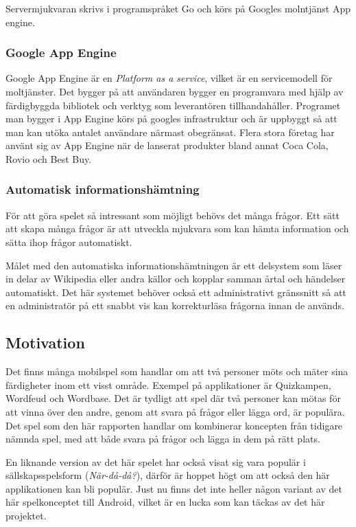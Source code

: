 \documentclass[12pt,a4paper]{article}
\begin{document}
Servermjukvaran skrivs i programspråket Go och körs på Googles molntjänst App engine.

\subsubsection{Google App Engine} 
Google App Engine är en \textit{Platform as a service}, vilket är en servicemodell för moltjänster. Det bygger på att användaren bygger en programvara med hjälp av färdigbyggda bibliotek och verktyg som leverantören tillhandahåller. Programet man bygger i App Engine körs på googles infrastruktur och är uppbyggt så att man kan utöka antalet användare närmast obegränsat. Flera stora företag har använt sig av App Engine när de lanserat produkter bland annat Coca Cola, Rovio och Best Buy. \cite{googleappenginecustomers}

\subsubsection{Automatisk informationshämtning}
För att göra spelet så intressant som möjligt behövs det många frågor. Ett sätt att skapa många frågor är att utveckla mjukvara som kan hämta information och sätta ihop frågor automatiskt. 

Målet med den automatiska informationshämtningen är ett delsystem som läser in delar av Wikipedia eller andra källor och kopplar samman årtal och händelser automatiskt. Det här systemet behöver också ett administrativt gränssnitt så att en administratör på ett snabbt vis kan korrekturläsa frågorna innan de används.

\subsection{Motivation}
Det finns många mobilspel som handlar om att två personer möts och mäter sina färdigheter inom ett visst område. Exempel på applikationer är Quizkampen, Wordfeud och Wordbase. Det är tydligt att spel där två personer kan mötas för att vinna över den andre, genom att svara på frågor eller lägga ord, är populära. Det spel som den här rapporten handlar om kombinerar koncepten från tidigare nämnda spel, med att både svara på frågor och lägga in dem på rätt plats. 

En liknande version av det här spelet har också visat sig vara populär i sällskapsspelsform (\textit{När-då-då?})\cite{nardada}, därför är hoppet högt om att också den här applikationen kan bli populär. Just nu finns det inte heller någon variant av det här spelkonceptet till Android, vilket är en lucka som kan täckas av det här projektet.
\end{document}
